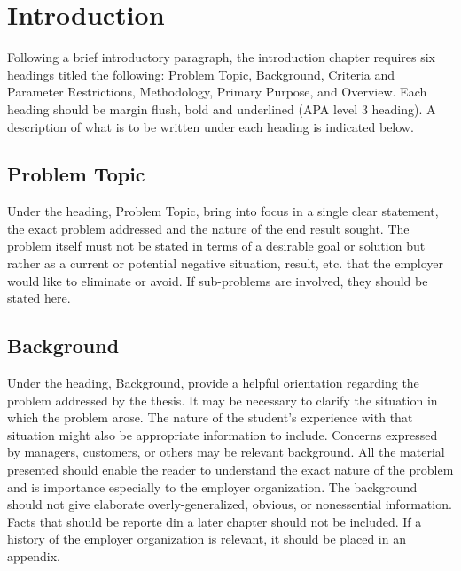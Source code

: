 %
%
%


\chapter{Introduction}

Following a brief introductory paragraph, the introduction chapter requires six headings titled the following: Problem Topic, Background, Criteria and Parameter Restrictions, Methodology, Primary Purpose, and Overview. Each heading should be margin flush, bold and underlined (APA level 3 heading). A description of what is to be written under each heading is indicated below.

\section{Problem Topic}

Under the heading, Problem Topic, bring into focus in a single clear statement, the exact problem addressed and the nature of the end result sought. The problem itself must not be stated in terms of a desirable goal or solution but rather as a current or potential negative situation, result, etc. that the employer would like to eliminate or avoid. If sub-problems are involved, they should be stated here.

\section{Background}

Under the heading, Background, provide a helpful orientation regarding the problem addressed by the thesis.  It may be necessary to clarify the situation in which the problem arose.  The nature of the student's experience with that situation might also be appropriate information to include.  Concerns expressed by managers, customers, or others may be relevant background.  All the material presented should enable the reader to understand the exact nature of the problem and is importance especially to the employer organization.  The background should not give elaborate overly-generalized, obvious, or  nonessential information.  Facts that should be reporte din a later chapter should not be included.  If a history of the employer organization is relevant, it should be placed in an appendix.

